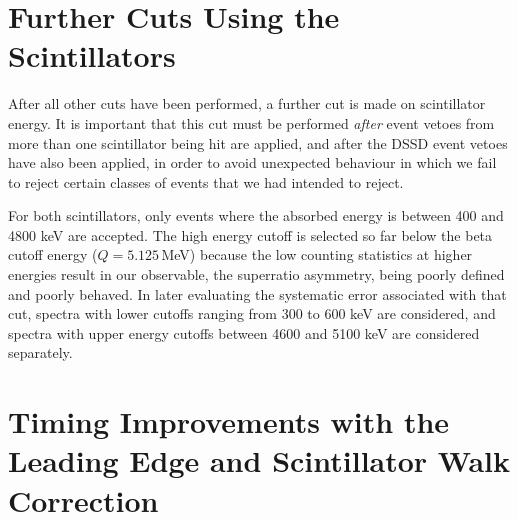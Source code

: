 \section{Further Cuts Using the Scintillators}
After all other cuts have been performed, a further cut is made on scintillator energy.  It is important that this cut must be performed \emph{after} event vetoes from more than one scintillator being hit are applied, and after the DSSD event vetoes have also been applied, in order to avoid unexpected behaviour in which we fail to reject certain classes of events that we had intended to reject.  

For both scintillators, only events where the absorbed energy is between 400 and 4800 keV are accepted.  The high energy cutoff is selected so far below the beta cutoff energy ($Q=5.125\,$MeV) because the low counting statistics at higher energies result in our observable, the superratio asymmetry, being poorly defined and poorly behaved.  In later evaluating the systematic error associated with that cut, spectra with lower cutoffs ranging from 300 to 600 keV are considered, and spectra with upper energy cutoffs between 4600 and 5100 keV are considered separately.  




\section{Timing Improvements with the Leading Edge and Scintillator Walk Correction}
\label{section:emcp_cuts}

